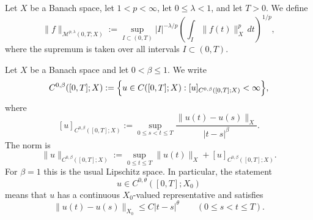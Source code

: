 \documentclass[smallextended,envcountsect,envcountsame]{svjour3}
\begin{document}
	\begin{definition}\label{def:time-morrey}
		Let $X$ be a Banach space, let $1<p<\infty$, let $0\le \lambda<1$, and let $T>0$. We define
		\[
		\|f\|_{\mathcal M^{p,\lambda}(0,T;X)}
		:=
		\sup_{I\subset(0,T)}
		|I|^{-\lambda/p}
		\left(\int_I \|f(t)\|_X^p\,dt\right)^{1/p},
		\]
		where the supremum is taken over all intervals $I\subset(0,T)$.
	\end{definition}
	
	\begin{definition}\label{def:holder-space}
		Let $X$ be a Banach space and let $0<\beta\le 1$. We write
		\[
		C^{0,\beta}([0,T];X)
		:=
		\Bigl\{u\in C([0,T];X):
		[u]_{C^{0,\beta}([0,T];X)}<\infty\Bigr\},
		\]
		where
		\[
		[u]_{C^{0,\beta}([0,T];X)}
		:=
		\sup_{0\le s<t\le T}
		\frac{\|u(t)-u(s)\|_X}{|t-s|^{\beta}}.
		\]
		The norm is
		\[
		\|u\|_{C^{0,\beta}([0,T];X)}
		:=
		\sup_{0\le t\le T}\|u(t)\|_X
		+
		[u]_{C^{0,\beta}([0,T];X)}.
		\]
		For $\beta=1$ this is the usual Lipschitz space. In particular, the statement
		\[
		u\in C^{0,\theta}([0,T];X_0)
		\]
		means that $u$ has a continuous $X_0$-valued representative and satisfies
		\[
		\|u(t)-u(s)\|_{X_0}\le C|t-s|^\theta
		\qquad(0\le s<t\le T).
		\]
	\end{definition}
	
\end{document}
